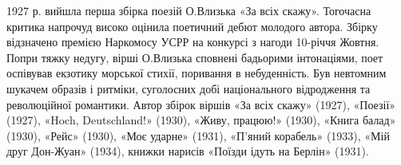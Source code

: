 1927 р. вийшла перша збірка поезій О.Влизька «За всіх скажу». Тогочасна критика
напрочуд високо оцінила поетичний дебют молодого автора. Збірку відзначено
премією Наркомосу УСРР на конкурсі з нагоди 10-річчя Жовтня. Попри тяжку
недугу, вірші О.Влизька сповнені бадьорими інтонаціями, поет оспівував екзотику
морської стихії, поривання в небуденність. Був невтомним шукачем образів і
ритміки, суголосних добі національного відродження та революційної романтики.
Автор збірок віршів «За всіх скажу» (1927), «Поезії» (1927), «Hoch,
Deutschland!» (1930), «Живу, працюю!» (1930), «Книга балад» (1930), «Рейс»
(1930), «Моє ударне» (1931), «П'яний корабель» (1933), «Мій друг Дон-Жуан»
(1934), книжки нарисів «Поїзди ідуть на Берлін» (1931).
